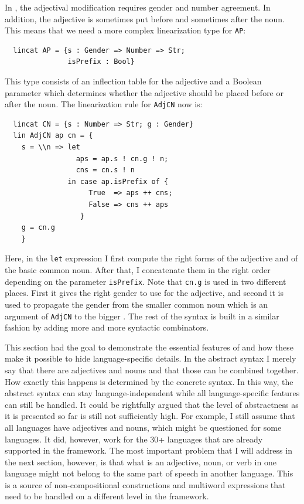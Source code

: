 \documentclass[output=paper]{langsci/langscibook}
\begin{document}
In , the adjectival modification requires gender and number agreement. 
In addition, the adjective is sometimes put before and sometimes after the noun. 
This means that we need a more complex linearization type for \verb=AP=:
\begin{verbatim}
  lincat AP = {s : Gender => Number => Str;
               isPrefix : Bool}
\end{verbatim}
This type consists of an inflection table for the adjective and a Boolean parameter which determines whether the adjective should be placed before or after the noun. The linearization rule for \verb=AdjCN= now is:
\begin{verbatim}
  lincat CN = {s : Number => Str; g : Gender}
  lin AdjCN ap cn = {
    s = \\n => let 
                 aps = ap.s ! cn.g ! n; 
                 cns = cn.s ! n
               in case ap.isPrefix of {
                    True  => aps ++ cns;
                    False => cns ++ aps
                  }
    g = cn.g
    }
\end{verbatim}
Here, in the \verb=let= expression I first compute the right forms of 
the adjective and of the basic common noun. After that, 
I concatenate them in the right order depending on 
the parameter \verb=isPrefix=. Note that \verb=cn.g= 
is used in two different places. First it gives the right gender 
to use for the adjective, and second it is used to propagate 
the gender from the smaller common noun which is an 
argument of \verb=AdjCN= to the bigger . 
The rest of the syntax is built in a similar fashion by adding more 
and more syntactic combinators.

This section had the goal to demonstrate
the essential features of  and how these make it possible to 
hide language-specific details. In the abstract syntax I merely 
say that there are adjectives and nouns and that those 
can be combined together. How exactly this happens is determined by 
the concrete syntax. In this way, the abstract syntax 
can stay language-independent while all language-specific features 
can still be handled. It could be rightfully argued that 
the level of abstractness as it is presented so far is still not 
sufficiently high. For example, I still assume that all languages 
have adjectives and nouns, which might be questioned for some languages. 
It did, however, work for the 30+ languages that are already supported 
in the framework. 
The most important problem that I will address in the next section, 
however, is that what is an adjective, noun, or verb in 
one language might not belong to the same part of speech in another language.
This is a source of non-compositional constructions and 
multiword expressions that need to be handled on a different level 
in the framework.
\end{document}
